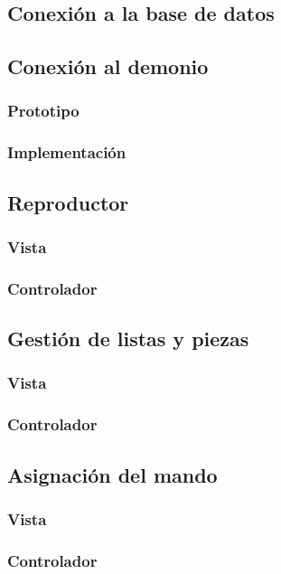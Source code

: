 \subsection{Conexión a la base de datos}

\subsection{Conexión al demonio}
\subsubsection{Prototipo}
\subsubsection{Implementación}

\subsection{Reproductor}
\subsubsection{Vista}
\subsubsection{Controlador}

\subsection{Gestión de listas y piezas}
\subsubsection{Vista}
\subsubsection{Controlador}

\subsection{Asignación del mando}
\subsubsection{Vista}
\subsubsection{Controlador}

